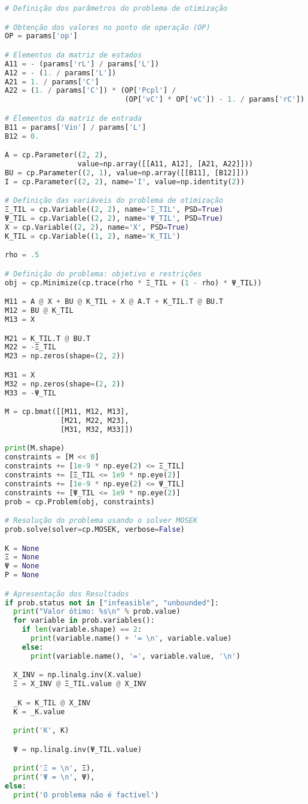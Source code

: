 \vspace{8pt}
\begin{lstlisting}[language=Python, caption={Resolução do problema de otimização definida em \eqref{eq:optimization_problem}.}, label=cod:params_etm]
# Definição dos parâmetros do problema de otimização

# Obtenção dos valores no ponto de operação (OP)
OP = params['op']

# Elementos da matriz de estados
A11 = - (params['rL'] / params['L'])
A12 = - (1. / params['L'])
A21 = 1. / params['C']
A22 = (1. / params['C']) * (OP['Pcpl'] /
                            (OP['vC'] * OP['vC']) - 1. / params['rC'])

# Elementos da matriz de entrada
B11 = params['Vin'] / params['L']
B12 = 0.

A = cp.Parameter((2, 2),
                 value=np.array([[A11, A12], [A21, A22]]))
BU = cp.Parameter((2, 1), value=np.array([[B11], [B12]]))
I = cp.Parameter((2, 2), name='I', value=np.identity(2))

# Definição das variáveis do problema de otimização
Ξ_TIL = cp.Variable((2, 2), name='Ξ_TIL', PSD=True)
Ψ_TIL = cp.Variable((2, 2), name='Ψ_TIL', PSD=True)
X = cp.Variable((2, 2), name='X', PSD=True)
K_TIL = cp.Variable((1, 2), name='K_TIL')

rho = .5

# Definição do problema: objetivo e restrições
obj = cp.Minimize(cp.trace(rho * Ξ_TIL + (1 - rho) * Ψ_TIL))

M11 = A @ X + BU @ K_TIL + X @ A.T + K_TIL.T @ BU.T
M12 = BU @ K_TIL
M13 = X

M21 = K_TIL.T @ BU.T
M22 = -Ξ_TIL
M23 = np.zeros(shape=(2, 2))

M31 = X
M32 = np.zeros(shape=(2, 2))
M33 = -Ψ_TIL

M = cp.bmat([[M11, M12, M13],
             [M21, M22, M23],
             [M31, M32, M33]])

print(M.shape)
constraints = [M << 0]
constraints += [1e-9 * np.eye(2) <= Ξ_TIL]
constraints += [Ξ_TIL <= 1e9 * np.eye(2)]
constraints += [1e-9 * np.eye(2) <= Ψ_TIL]
constraints += [Ψ_TIL <= 1e9 * np.eye(2)]
prob = cp.Problem(obj, constraints)

# Resolução do problema usando o solver MOSEK
prob.solve(solver=cp.MOSEK, verbose=False)

K = None
Ξ = None
Ψ = None
P = None

# Apresentação dos Resultados
if prob.status not in ["infeasible", "unbounded"]:
  print("Valor ótimo: %s\n" % prob.value)
  for variable in prob.variables():
    if len(variable.shape) == 2:
      print(variable.name() + '= \n', variable.value)
    else:
      print(variable.name(), '=', variable.value, '\n')

  X_INV = np.linalg.inv(X.value)
  Ξ = X_INV @ Ξ_TIL.value @ X_INV

  _K = K_TIL @ X_INV
  K = _K.value

  print('K', K)

  Ψ = np.linalg.inv(Ψ_TIL.value)

  print('Ξ = \n', Ξ),
  print('Ψ = \n', Ψ),
else:
  print('O problema não é factível')
\end{lstlisting}

